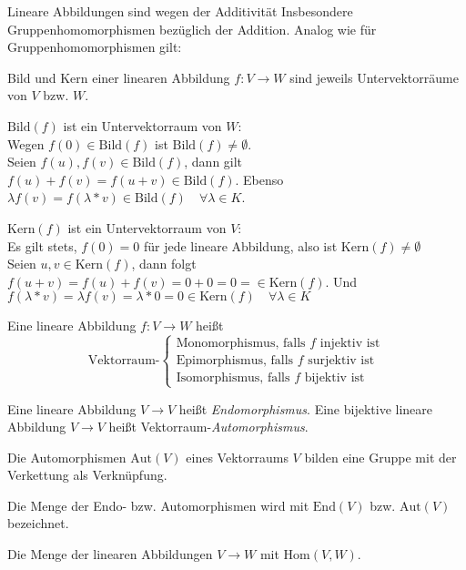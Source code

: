 Lineare Abbildungen sind wegen der Additivität Insbesondere Gruppenhomomorphismen bezüglich der Addition. Analog wie für Gruppenhomomorphismen gilt:

\begin{satz}{}
  Bild und Kern einer linearen Abbildung $f:V\rightarrow W$ sind jeweils Untervektorräume von $V$ bzw. $W$.
\end{satz}

\beweis
$\mathrm{Bild}(f)$ ist ein Untervektorraum von $W$:\\
Wegen $f(0)\in\mathrm{Bild}(f)$ ist $\mathrm{Bild}(f)\neq\emptyset$.\\
Seien $f(u),f(v)\in\mathrm{Bild}(f)$, dann gilt $f(u)+f(v)=f(u+v)\in\mathrm{Bild}(f)$.
Ebenso $\lambda f(v)=f(\lambda*v)\in\mathrm{Bild}(f) \quad \forall\lambda\in K$.

\bigskip

$\mathrm{Kern}(f)$ ist ein Untervektorraum von $V$:\\
Es gilt stets, $f(0)=0$ für jede lineare Abbildung, also ist $\mathrm{Kern}(f)\neq \emptyset$\\
Seien $u,v\in \mathrm{Kern}(f)$, dann folgt $f(u+v)=f(u)+f(v)=0+0=0=\in\mathrm{Kern}(f)$.
Und $f(\lambda *v)=\lambda f(v)=\lambda*0=0\in\mathrm{Kern}(f) \quad\forall \lambda\in K$


\begin{definition}{}
  Eine lineare Abbildung $f: V\rightarrow W$ heißt
  \begin{equation*}
    \text{Vektorraum-}
    \begin{cases}
      \text{Monomorphismus, falls $f$ injektiv ist}\\
      \text{Epimorphismus, falls $f$ surjektiv ist}\\
      \text{Isomorphismus, falls $f$ bijektiv ist}
    \end{cases}
  \end{equation*}

  Eine lineare Abbildung $V\rightarrow V$ heißt \emph{Endomorphismus}.
  Eine bijektive lineare Abbildung $V\rightarrow V$ heißt Vektorraum-\emph{Automorphismus}.


  \bemerkung
  Die Automorphismen $\mathrm{Aut}(V)$ eines Vektorraums $V$ bilden eine Gruppe mit der Verkettung als Verknüpfung.

  Die Menge der Endo- bzw. Automorphismen wird mit $\mathrm{End}(V)$ bzw. $\mathrm{Aut}(V)$ bezeichnet.

  Die Menge der linearen Abbildungen $V\rightarrow W$ mit $\mathrm{Hom}(V,W)$.
\end{definition}


